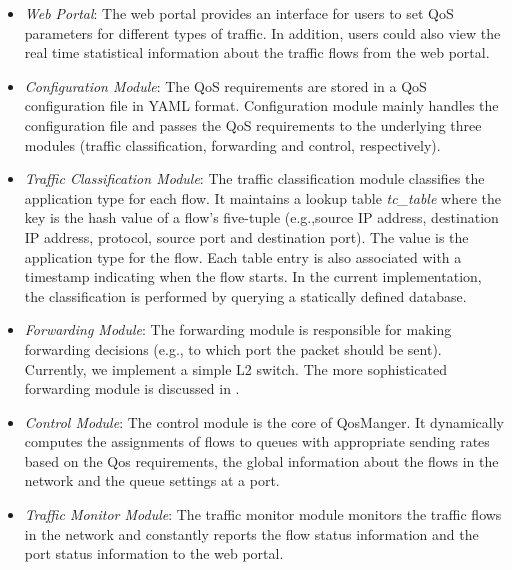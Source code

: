 \begin{itemize}
  \item \emph{Web Portal}: The web portal provides an interface for users to set QoS parameters for
    different types of traffic. In addition, users could also view the real time statistical information
    about the traffic flows from the web portal.
  \item \emph{Configuration Module}: The QoS requirements are stored in a QoS configuration file in YAML
    format. Configuration module mainly handles the configuration file and passes the QoS requirements
    to the underlying three modules (traffic classification, forwarding and control, respectively).
  \item \emph{Traffic Classification Module}: The traffic classification module classifies the application
    type for each flow. It maintains a lookup table \emph{tc\_table} where the key is the hash value of a
    flow's five-tuple (e.g.,source IP address, destination IP address, protocol, source port and destination port).
    The value is the application type for the flow. Each table entry is also associated with a timestamp indicating
    when the flow starts. In the current implementation, the classification is performed by querying a statically
    defined database.
  \item \emph{Forwarding Module}: The forwarding module is responsible for making forwarding decisions (e.g.,
    to which port the packet should be sent). Currently, we implement a simple L2 switch. The more sophisticated
    forwarding module is discussed in .
  \item \emph{Control Module}: The control module is the core of QosManger. It dynamically computes the
    assignments of flows to queues with appropriate sending rates based on the Qos requirements, the global
    information about the flows in the network and the queue settings at a port.
  \item \emph{Traffic Monitor Module}: The traffic monitor module monitors the traffic flows in the network
    and constantly reports the flow status information and the port status information to the web portal.
\end{itemize}

